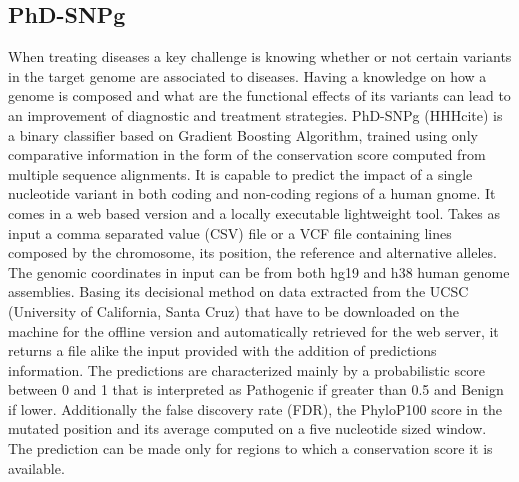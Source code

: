 \subsection{PhD-SNPg}
When treating diseases a key challenge is knowing whether or not certain variants in the target genome are associated to diseases. Having a knowledge on how a genome is composed and what are the functional effects of its variants can lead to an improvement of diagnostic and treatment strategies. PhD-SNPg (HHHcite) is a binary classifier based on Gradient Boosting Algorithm, trained using only comparative information in the form of the conservation score computed from multiple sequence alignments. It is capable to predict the impact of a single nucleotide variant in both coding and non-coding regions of a human gnome. It comes in a web based version and a locally executable lightweight tool. Takes as input a comma separated value (CSV) file or a VCF file containing lines composed by the chromosome, its position, the reference and alternative alleles. The genomic coordinates in input can be from both hg19 and h38 human genome assemblies. Basing its decisional method on data extracted from the UCSC (University of California, Santa Cruz) that have to be downloaded on the machine for the offline version and automatically retrieved for the web server, it returns a file alike the input provided with the addition of predictions information. The predictions are characterized mainly by a probabilistic score between 0 and 1 that is interpreted as Pathogenic if greater than 0.5 and Benign if lower. Additionally the false discovery rate (FDR), the PhyloP100 score in the mutated position and its average computed on a five nucleotide sized window. The prediction can be made only for regions to which a conservation score it is available.



